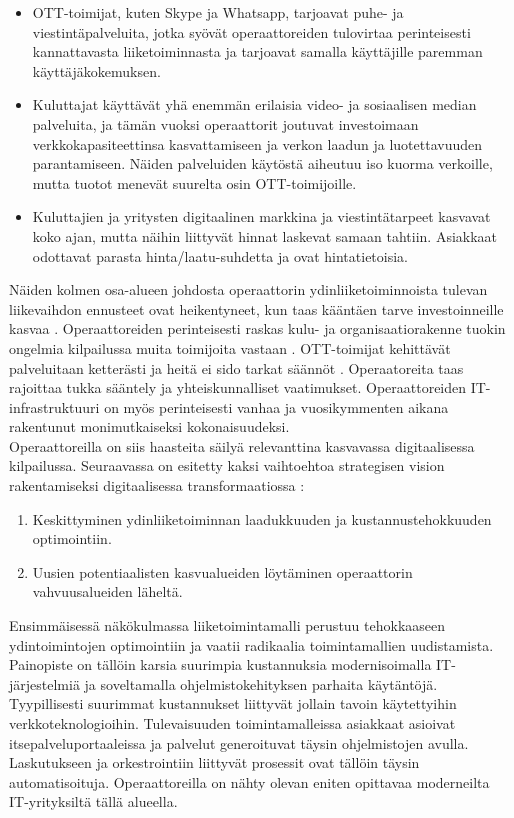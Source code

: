 \documentclass[finnish,12pt,a4paper,pdftex]{article}
\begin{document}
\begin{itemize}
    \item OTT-toimijat, kuten Skype ja Whatsapp, tarjoavat puhe- ja viestintäpalveluita, jotka syövät operaattoreiden tulovirtaa perinteisesti kannattavasta liiketoiminnasta ja tarjoavat samalla käyttäjille paremman käyttäjäkokemuksen. 
    \item Kuluttajat käyttävät yhä enemmän erilaisia video- ja sosiaalisen median palveluita, ja tämän vuoksi operaattorit joutuvat investoimaan verkkokapasiteettinsa kasvattamiseen ja verkon laadun ja luotettavuuden parantamiseen. Näiden palveluiden käytöstä aiheutuu iso kuorma verkoille, mutta tuotot menevät suurelta osin OTT-toimijoille.
    \item Kuluttajien ja yritysten digitaalinen markkina ja viestintätarpeet kasvavat koko ajan, mutta näihin liittyvät hinnat laskevat samaan tahtiin. Asiakkaat odottavat parasta hinta/laatu-suhdetta ja ovat hintatietoisia. 
\end{itemize}

Näiden kolmen osa-alueen johdosta operaattorin ydinliiketoiminnoista tulevan liikevaihdon ennusteet ovat heikentyneet, kun taas kääntäen tarve investoinneille kasvaa \citep{mckinseyope}. Operaattoreiden perinteisesti raskas kulu- ja organisaatiorakenne tuokin ongelmia kilpailussa muita toimijoita vastaan \citep{inderes}. OTT-toimijat kehittävät palveluitaan ketterästi ja heitä ei sido tarkat säännöt \citep{mckinseytele}. Operaatoreita taas rajoittaa tukka sääntely ja yhteiskunnalliset vaatimukset. Operaattoreiden IT-infrastruktuuri on myös perinteisesti vanhaa ja vuosikymmenten aikana rakentunut monimutkaiseksi kokonaisuudeksi. \\

Operaattoreilla on siis haasteita säilyä relevanttina kasvavassa digitaalisessa kilpailussa. Seuraavassa on esitetty kaksi vaihtoehtoa strategisen vision rakentamiseksi digitaalisessa transformaatiossa \citep{mckinseyope, inderes}:

\begin{enumerate}
    \item Keskittyminen ydinliiketoiminnan laadukkuuden ja kustannustehokkuuden optimointiin.
    \item Uusien potentiaalisten kasvualueiden löytäminen operaattorin vahvuusalueiden läheltä.
\end{enumerate}

Ensimmäisessä näkökulmassa liiketoimintamalli perustuu tehokkaaseen ydintoimintojen optimointiin ja vaatii radikaalia toimintamallien uudistamista. Painopiste on tällöin karsia suurimpia kustannuksia modernisoimalla IT-järjestelmiä ja soveltamalla ohjelmistokehityksen parhaita käytäntöjä. Tyypillisesti suurimmat kustannukset liittyvät jollain tavoin käytettyihin verkkoteknologioihin. Tulevaisuuden toimintamalleissa asiakkaat asioivat itsepalveluportaaleissa ja palvelut generoituvat täysin ohjelmistojen avulla. Laskutukseen ja orkestrointiin liittyvät prosessit ovat tällöin täysin automatisoituja. Operaattoreilla on nähty olevan eniten opittavaa moderneilta IT-yrityksiltä tällä alueella. \citep{mckinseyope} \\
\end{document}
